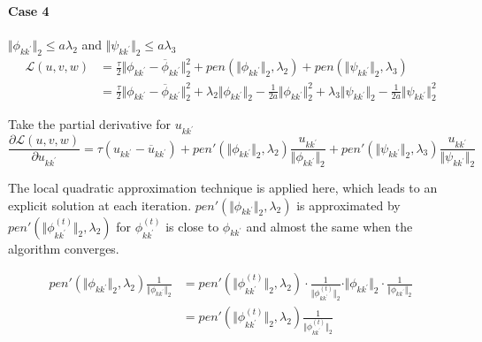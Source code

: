 \documentclass[12pt, a4paper, oneside]{article}
\numberwithin{equation}{section}
\begin{document}
\paragraph{Case 4} $\Vert\phi_{k{k^\prime}}\Vert_2 \leq a\lambda_2$ and $\Vert\psi_{k{k^\prime}}\Vert_2 \leq a\lambda_3$
\begin{equation}
	\label{eq:update_uvw-case4}
	\begin{aligned}
		\mathcal{L}(u,v,w) &=
		\frac{\tau}{2}\Vert\phi_{k{k^\prime}}-\overline\phi_{k{k^\prime}}\Vert_2^2 + pen(\Vert\phi_{k{k^\prime}}\Vert_2, \lambda_2) + pen(\Vert\psi_{k{k^\prime}}\Vert_2, \lambda_3) \\
		&= \frac{\tau}{2}\Vert\phi_{k{k^\prime}}-\overline\phi_{k{k^\prime}}\Vert_2^2 + \lambda_2 \Vert\phi_{k{k^\prime}}\Vert_2 - \frac{1}{2a}\Vert\phi_{k{k^\prime}}\Vert_2^2 + \lambda_3 \Vert\psi_{k{k^\prime}}\Vert_2 - \frac{1}{2a}\Vert\psi_{k{k^\prime}}\Vert_2^2
	\end{aligned}
\end{equation}

Take the partial derivative for $u_{k{k^\prime}}$
\begin{equation}
	\label{eq:update_uvw_der}
	\frac{\partial \mathcal{L}(u,v,w)}{\partial u_{k{k^\prime}}} =
	\tau(u_{k{k^\prime}} - \overline u_{k{k^\prime}}) + pen'(\Vert\phi_{k{k^\prime}}\Vert_2, \lambda_2)\frac{u_{k{k^\prime}}}{\Vert\phi_{k{k^\prime}}\Vert_2} + pen'(\Vert\psi_{k{k^\prime}}\Vert_2, \lambda_3)\frac{u_{k{k^\prime}}}{\Vert\psi_{k{k^\prime}}\Vert_2}
\end{equation}

The local quadratic approximation technique is applied here, which leads to an
explicit solution at each iteration. $pen'(\Vert\phi_{k{k^\prime}}\Vert_2, \lambda_2)$ is approximated by $pen'(\Vert\phi^{(t)}_{k{k^\prime}}\Vert_2, \lambda_2)$ for $\phi^{(t)}_{k{k^\prime}}$ is close to $\phi_{k{k^\prime}}$ and almost the same when the algorithm converges.

\begin{equation}
	\label{eq:local_quadratic_approximation}
	\begin{aligned}
	pen'(\Vert\phi_{k{k^\prime}}\Vert_2, \lambda_2)\frac{1}{\Vert\phi_{k{k^\prime}}\Vert_2} 
	&= pen'(\Vert\phi^{(t)}_{k{k^\prime}}\Vert_2, \lambda_2)\cdot\frac{1}{\Vert\phi^{(t)}_{k{k^\prime}}\Vert_2} \cdot\Vert\phi_{k{k^\prime}}\Vert_2 \cdot \frac{1}{\Vert\phi_{k{k^\prime}}\Vert_2} \\
	&= pen'(\Vert\phi^{(t)}_{k{k^\prime}}\Vert_2, \lambda_2)\frac{1}{\Vert\phi^{(t)}_{k{k^\prime}}\Vert_2}
	\end{aligned}
\end{equation}
\end{document}
